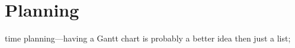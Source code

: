 \chapter{Planning}
\label{chap:planning}

time planning—having a Gantt chart is probably a better idea then just a list;